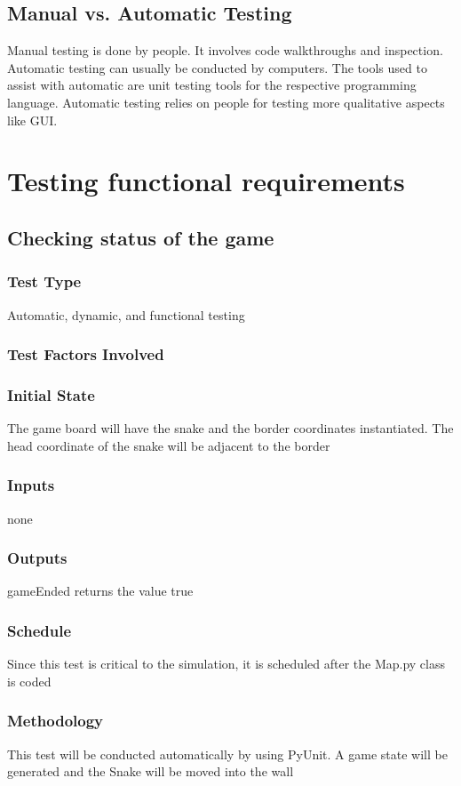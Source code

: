 \documentclass[12pt]{article}
\begin{document}
\subsection{Manual vs. Automatic Testing}
Manual testing is done by people. It involves code walkthroughs and inspection. \newline\newline
Automatic testing can usually be conducted by computers. The tools used to assist with automatic are unit testing tools for the respective programming language. Automatic testing relies on people for testing more qualitative aspects like GUI. 


\section{Testing functional requirements}

\noindent
\subsection{Checking status of the game}
\subsubsection*{Test Type}
Automatic, dynamic, and functional testing
\subsubsection*{Test Factors Involved}
\subsubsection*{Initial State}
The game board will have the snake and the border coordinates instantiated. The head coordinate of the snake will be adjacent to the border 
\subsubsection*{Inputs}
none
\subsubsection*{Outputs}
gameEnded returns the value true
\subsubsection*{Schedule}
Since this test is critical to the simulation, it is scheduled after the Map.py class is coded
\subsubsection*{Methodology}
This test will be conducted automatically by using PyUnit. A game state will be generated and the Snake will be moved into the wall
\end{document}
